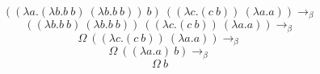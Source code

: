\documentclass[12pt]{article}
\begin{document}
$$((\lambda a.(\lambda b.b\ b)\ (\lambda b.b\ b))\ b)\ ((\lambda c.(c\ b))\ (\lambda a.a)) \rightarrow_\beta$$
$$((\lambda b.b\ b)\ (\lambda b.b\ b))\ ((\lambda c.(c\ b))\ (\lambda a.a)) \rightarrow_\beta$$
$$\Omega\ ((\lambda c.(c\ b))\ (\lambda a.a)) \rightarrow_\beta$$
$$\Omega\ ((\lambda a.a)\ b) \rightarrow_\beta$$
$$\Omega\ b$$
\end{document}
